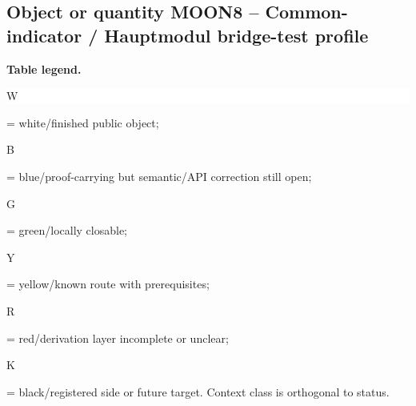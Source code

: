 \subsection*{Object or quantity MOON8 -- Common-indicator /\allowbreak{} Hauptmodul bridge-test profile}
\hypertarget{objproof:MOON8}{}
\par\smallskip\noindent\begin{minipage}{0.99\linewidth}\footnotesize\raggedright\textbf{Table legend.} \colorbox{white}{\strut W} = white/finished public object; \colorbox{cyan!20}{\strut B} = blue/proof-carrying but semantic/API correction still open; \colorbox{green!18}{\strut G} = green/locally closable; \colorbox{yellow!25}{\strut Y} = yellow/known route with prerequisites; \colorbox{red!20}{\strut R} = red/derivation layer incomplete or unclear; \colorbox{black!18}{\strut K} = black/registered side or future target. Context class is orthogonal to status.\end{minipage}\par\vspace{0.25em}
